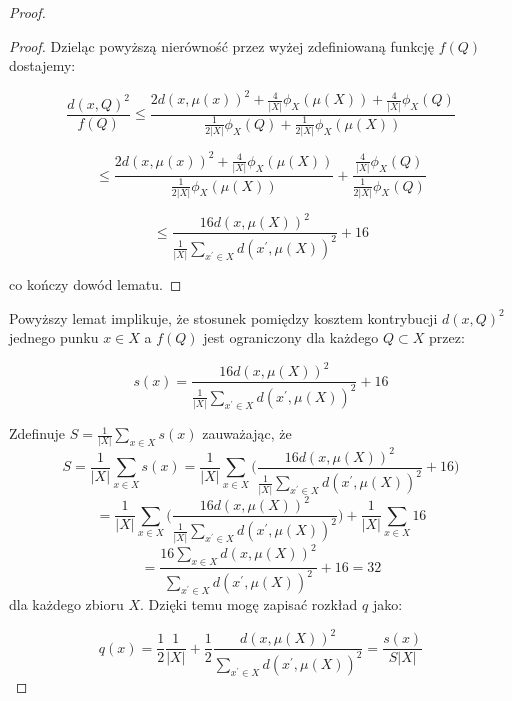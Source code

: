 \begin{proof}
\begin{proof}
    \noindent
    Dzieląc powyższą nierówność przez wyżej zdefiniowaną funkcję $f(Q)$ dostajemy:

    \begin{equation}
        \frac{d(x, Q)^2}{f(Q)} \leq \frac{2d(x, \mu(x))^2 +  \frac{4}{|X|} \phi_{X}(\mu(X))+ \frac{4}{|X|} \phi_{X}(Q)}{\frac{1}{2|X|}\phi_{X}(Q) + \frac{1}{2|X|}\phi_{X}(\mu(X))}
    \end{equation}

    \begin{equation}
        \leq \frac{2d(x, \mu(x))^2 +  \frac{4}{|X|} \phi_{X}(\mu(X))}{\frac{1}{2|X|}\phi_{X}(\mu(X))} + \frac{\frac{4}{|X|} \phi_{X}(Q)}{\frac{1}{2|X|}\phi_{X}(Q)}
    \end{equation}

    \begin{equation}
        \leq \frac{16d(x, \mu(X))^2}{\frac{1}{|X|}\sum_{x^{'} \in X}d(x^{'}, \mu(X))^2} + 16
    \end{equation}

    \noindent
    co kończy dowód lematu.
\end{proof}

\noindent
Powyższy lemat implikuje, że stosunek pomiędzy kosztem kontrybucji $d(x, Q)^2$ jednego punku $x \in X$ a $f(Q)$ jest ograniczony dla każdego $Q \subset X$ przez:

\begin{equation}
    s(x) = \frac{16d(x, \mu(X))^2}{\frac{1}{|X|}\sum_{x^{'} \in X}d(x^{'}, \mu(X))^2} + 16    
\end{equation}

\noindent
Zdefinuje $S = \frac{1}{|X|} \sum_{x \in X}s(x)$ zauważając, że 
\begin{equation}
    S =  \frac{1}{|X|}  \sum_{x \in X}s(x)  =  \frac{1}{|X|} \sum_{x \in X} \Big( \frac{16d(x, \mu(X))^2}{\frac{1}{|X|}\sum_{x^{'} \in X}d(x^{'}, \mu(X))^2} + 16 \Big)
\end{equation}
\begin{equation}
    =  \frac{1}{|X|} \sum_{x \in X} \Big( \frac{16d(x, \mu(X))^2}{\frac{1}{|X|}\sum_{x^{'} \in X}d(x^{'}, \mu(X))^2} \Big) + \frac{1}{|X|} \sum_{x \in X} 16 
\end{equation}
\begin{equation}
    = \frac{16  \sum_{x \in X}  d(x, \mu(X))^2}{\sum_{x^{'} \in X}d(x^{'}, \mu(X))^2} + 16 = 32
\end{equation}
dla każdego zbioru $X$.
Dzięki temu mogę zapisać rozkład $q$ jako:

\begin{equation}
    q(x) = \frac{1}{2}\frac{1}{|X|} + \frac{1}{2}\frac{d(x, \mu(X))^2}{\sum_{x^{'} \in X}d(x^{'}, \mu(X))^2} = \frac{s(x)}{S|X|}
\end{equation}


\end{proof}
